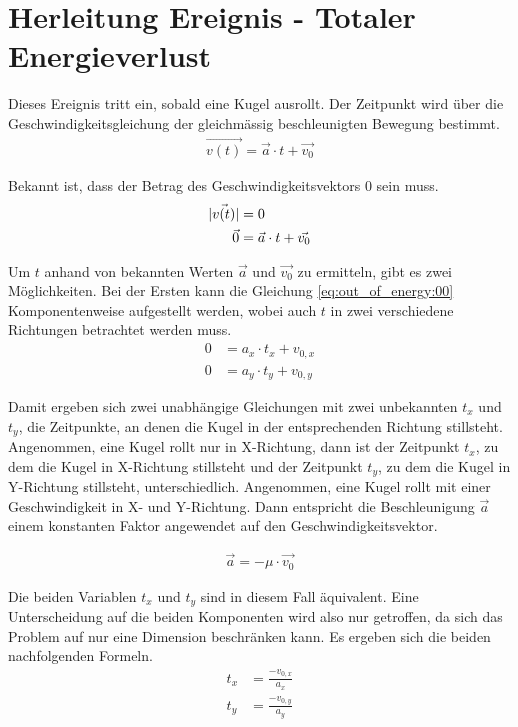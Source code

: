 \section{Herleitung Ereignis - Totaler Energieverlust}\label{anhang:herleitung:event:outOfEnergy}

Dieses Ereignis tritt ein, sobald eine Kugel ausrollt. Der Zeitpunkt wird über die Geschwindigkeitsgleichung der
gleichmässig beschleunigten Bewegung bestimmt.
\begin{align}
    \vec{v(t)} = \vec{a} \cdot t + \vec{v_0}
\end{align}

Bekannt ist, dass der Betrag des Geschwindigkeitsvektors $0$ sein muss.
\begin{align}
    \lvert \vec{v(t)} \rvert &= 0\\
    \vec{0} &= \vec{a} \cdot t + \vec{v_0}\label{eq:out_of_energy:00}
\end{align}

Um $t$ anhand von bekannten Werten $\vec{a}$ und $\vec{v_0}$ zu ermitteln, gibt es zwei Möglichkeiten. Bei der Ersten
kann die Gleichung \ref{eq:out_of_energy:00} Komponentenweise aufgestellt werden, wobei auch $t$ in zwei verschiedene
Richtungen betrachtet werden muss.
\begin{align}
    0 &= a_x \cdot t_x + v_{0,x}\\
    0 &= a_y \cdot t_y + v_{0,y}
\end{align}

Damit ergeben sich zwei unabhängige Gleichungen mit zwei unbekannten $t_x$ und $t_y$, die Zeitpunkte, an denen die Kugel in der
entsprechenden Richtung stillsteht.
Angenommen, eine Kugel rollt nur in X-Richtung, dann ist der Zeitpunkt $t_x$, zu dem die Kugel in X-Richtung stillsteht
und der Zeitpunkt $t_y$, zu dem die Kugel in Y-Richtung stillsteht, unterschiedlich.
Angenommen, eine Kugel rollt mit einer Geschwindigkeit in X- und Y-Richtung. Dann entspricht die Beschleunigung $\vec{a}$
einem konstanten Faktor angewendet auf den Geschwindigkeitsvektor.

\begin{align}
    \vec{a} = -\mu \cdot \vec{v_0}
\end{align}

Die beiden Variablen $t_x$ und $t_y$ sind in diesem Fall äquivalent. Eine Unterscheidung auf die beiden Komponenten wird
also nur getroffen, da sich das Problem auf nur eine Dimension beschränken kann. Es ergeben sich die beiden nachfolgenden
Formeln.
\begin{align}
    t_x &= \frac{-v_{0,x}}{a_x}\\
    t_y &= \frac{-v_{0,y}}{a_y}
\end{align}


